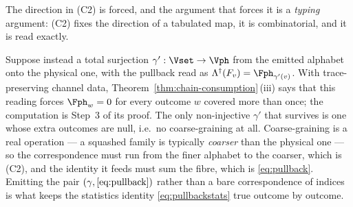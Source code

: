
\begin{remark}
\label{rem:coarse}
The direction in (C2) is forced, and the argument that forces it is a
\emph{typing} argument: (C2) fixes the direction of a tabulated map, it is
combinatorial, and it is read exactly.

Suppose instead a total surjection
$\gamma':\Vset\to\Vph$ from the emitted alphabet onto the physical one, with the
pullback read as $\Lambda^{\dagger}(F_v)=\Fph_{\gamma'(v)}$. With
trace-preserving channel data, Theorem~\ref{thm:chain-consumption}\,(iii)
says that this reading forces $\Fph_w=0$ for every outcome $w$ covered more
than once; the computation is Step~3 of its proof. The only non-injective $\gamma'$ that
survives is one whose extra outcomes are null, i.e.\ no coarse-graining at all.
Coarse-graining is a real operation --- a squashed family is typically
\emph{coarser} than the physical one --- so the correspondence must run from
the finer alphabet to the coarser, which is (C2), and the identity it feeds
must sum the fibre, which is \eqref{eq:pullback}. Emitting the pair
$(\gamma,\eqref{eq:pullback})$ rather than a bare correspondence of indices is
what keeps the statistics identity \eqref{eq:pullbackstats} true outcome by
outcome.
\end{remark}

